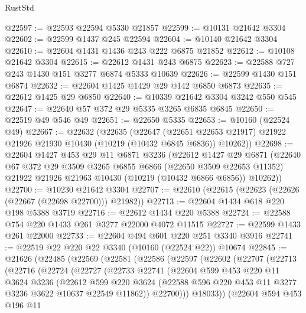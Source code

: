 \begin{lexlean}{RustStd}
\begin{coremodule}
@22597 := @22593 @22594 @5330 @21857
@22599 := @10131 @21642 @3304
@22602 := @22599 @1437 @245 @22594
@22604 := @10140 @21642 @3304
@22610 := @22604 @1431 @1436 @243 @222 @6875 @21852
@22612 := @10108 @21642 @3304
@22615 := @22612 @1431 @243 @6875
@22623 := @22588 @727 @243 @1430 @151 @3277 @6874 @5333 @10639
@22626 := @22599 @1430 @151 @6874
@22632 := @22604 @1425 @1429 @29 @142 @6850 @6873
@22635 := @22612 @1425 @29 @6850
@22640 := @10339 @21642 @3304 @3242 @550 @545
@22647 := @22640 @57 @372 @29 @5335 @3265 @6835 @6845
@22650 := @22519 @49 @546 @49
@22651 := @22650 @5335
@22653 := @10160 (@22524 @49)
@22667 := @22632
    (@22635
      (@22647
        (@22651 @22653 @21917)
        @21922
        @21926
        @21930
        @10430
        (@10219 (@10432 @6845 @6836))
        @10262))
@22698 := @22604
    @1427
    @453
    @29
    @11
    @6871
    @3236
    (@22612
      @1427
      @29
      @6871
      (@22640
        @67
        @372
        @29
        @3509
        @3265
        @6855
        @6866
        (@22650 @3509 @22653 @11352)
        @21922
        @21926
        @21963
        @10430
        (@10219 (@10432 @6866 @6856))
        @10262))
@22700 := @10230 @21642 @3304
@22707 := @22610 (@22615 (@22623 (@22626 (@22667 (@22698 @22700))) @21982))
@22713 := @22604 @1434 @618 @220 @198 @5388 @3719
@22716 := @22612 @1434 @220 @5388
@22724 := @22588 @754 @220 @1433 @261 @3277 @22000 @4072 @11515
@22727 := @22599 @1433 @261 @22000
@22733 := @22604 @494 @601 @220 @251 @3340 @3916
@22741 := @22519 @22 @220 @22 @3340 (@10160 (@22524 @22)) @10674
@22845 := @21626
    (@22485
      (@22569
        (@22581
          (@22586
            (@22597
              (@22602
                (@22707
                  (@22713
                    (@22716
                      (@22724
                        (@22727
                          (@22733
                            @22741
                            (@22604
                              @599
                              @453
                              @220
                              @11
                              @3624
                              @3236
                              (@22612
                                @599
                                @220
                                @3624
                                (@22588 @596 @220 @453 @11 @3277 @3236 @3622 @10637 @22549 @11862))
                              @22700)))
                        @18033))
                    (@22604
                      @594
                      @453
                      @196
                      @11

\end{coremodule}
\end{lexlean}
